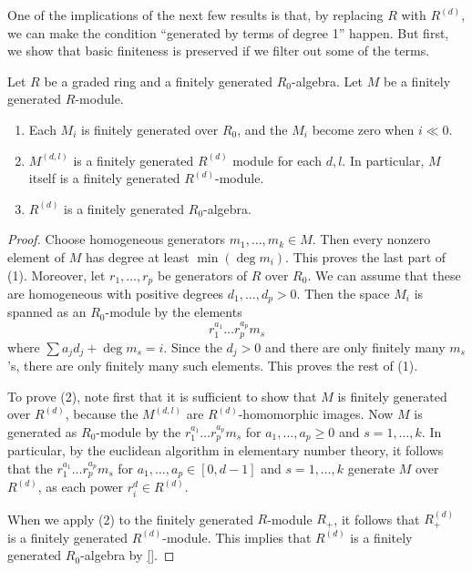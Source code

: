 One of the implications of the next few results is that, by replacing $R$ with
$R^{(d)}$, we can make the condition ``generated by terms of degree 1'' happen.
But first, we show that basic finiteness is preserved if we filter out some of
the terms.

\begin{proposition} \label{duple preserves finiteness}
Let $R$ be a graded ring and a finitely generated $R_0$-algebra. Let $M$ be a
finitely generated $R$-module.
\begin{enumerate}
\item Each $M_i$ is finitely generated over $R_0$, and the $M_i$ become zero when $i \ll
0$.
\item  $M^{(d,l)}$ is a finitely generated $R^{(d)}$ module for each $d,l$. In
particular, $M$ itself is a finitely generated $R^{(d)}$-module.
\item $R^{(d)}$ is a finitely generated $R_0$-algebra.
\end{enumerate}
\end{proposition} 
\begin{proof} 
Choose homogeneous generators $m_1, \dots, m_k \in M$. Then every nonzero
element of $M$ has degree at least $\min(\deg m_i)$.  This proves the
last part of (1). Moreover, let $r_1, \dots, r_p$ be generators of $R$ over
$R_0$.
We can assume that these are homogeneous with positive degrees $d_1, \dots, d_p>0$.
Then the space $M_i$ is spanned as an $R_0$-module by the elements
\[  r_1^{a_1} \dots r_p^{a_p} m_s  \]
where $\sum a_j d_j + \deg m_s = i$.  Since the $d_j>0$ and there are only
finitely many $m_s$'s, there are only finitely many such elements. This proves
the rest of (1).

To prove (2), note first that it is sufficient to show that $M$ is finitely
generated over $R^{(d)}$, because the $M^{(d,l)}$ are $R^{(d)}$-homomorphic
images.
Now $M$ is generated as $R_0$-module by the $r_1^{a_1} \dots r_p^{a_p} m_s $
for $a_1, \dots, a_p \geq 0$ and $s = 1, \dots,  k$.
In particular, by the euclidean algorithm in elementary number theory, it
follows that the 
$r_1^{a_1} \dots r_p^{a_p} m_s $
for $a_1, \dots, a_p \in [0, d-1]$ and $s = 1, \dots,  k$ generate $M$ over
$R^{(d)}$, as each power $r_i^{d} \in R^{(d)}$.

When we apply (2) to the finitely generated $R$-module $R_+$, it follows that $R^{(d)}_+$ is a finitely generated
$R^{(d)}$-module. This implies that $R^{(d)}$ is a finitely generated
$R_0$-algebra by \cref{}.
\end{proof}

